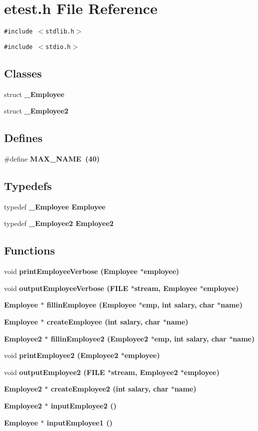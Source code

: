 \section{etest.h File Reference}
\label{etest_8h}
{\tt \#include $<$stdlib.h$>$}\par
{\tt \#include $<$stdio.h$>$}\par
\subsection*{Classes}
\begin{CompactItemize}
\item 
struct \bf{\_\-Employee}
\item 
struct \bf{\_\-Employee2}
\end{CompactItemize}
\subsection*{Defines}
\begin{CompactItemize}
\item 
\#define \bf{MAX\_\-NAME}~(40)
\end{CompactItemize}
\subsection*{Typedefs}
\begin{CompactItemize}
\item 
typedef \bf{\_\-Employee} \bf{Employee}
\item 
typedef \bf{\_\-Employee2} \bf{Employee2}
\end{CompactItemize}
\subsection*{Functions}
\begin{CompactItemize}
\item 
void \bf{print\-Employee\-Verbose} (\bf{Employee} $\ast$employee)
\item 
void \bf{output\-Employee\-Verbose} (FILE $\ast$stream, \bf{Employee} $\ast$employee)
\item 
\bf{Employee} $\ast$ \bf{fillin\-Employee} (\bf{Employee} $\ast$emp, int salary, char $\ast$name)
\item 
\bf{Employee} $\ast$ \bf{create\-Employee} (int salary, char $\ast$name)
\item 
\bf{Employee2} $\ast$ \bf{fillin\-Employee2} (\bf{Employee2} $\ast$emp, int salary, char $\ast$name)
\item 
void \bf{print\-Employee2} (\bf{Employee2} $\ast$employee)
\item 
void \bf{output\-Employee2} (FILE $\ast$stream, \bf{Employee2} $\ast$employee)
\item 
\bf{Employee2} $\ast$ \bf{create\-Employee2} (int salary, char $\ast$name)
\item 
\bf{Employee2} $\ast$ \bf{input\-Employee2} ()
\item 
\bf{Employee} $\ast$ \bf{input\-Employee1} ()
\end{CompactItemize}


